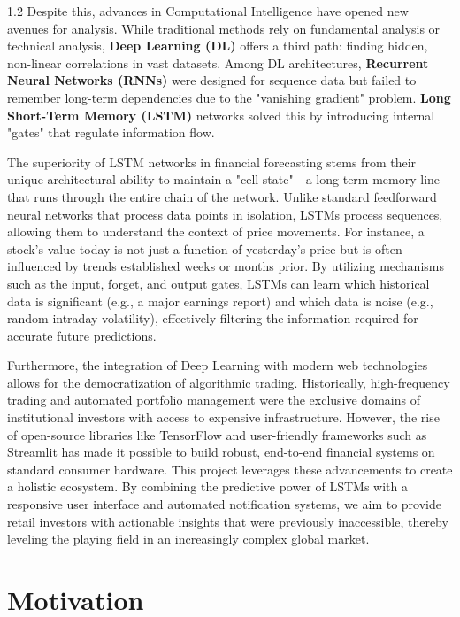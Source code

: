 \documentclass[12pt, a4paper]{report}
\begin{document}
\begin{spacing}{1.2}
Despite this, advances in Computational Intelligence have opened new avenues for analysis. While traditional methods rely on fundamental analysis or technical analysis, \textbf{Deep Learning (DL)} offers a third path: finding hidden, non-linear correlations in vast datasets. Among DL architectures, \textbf{Recurrent Neural Networks (RNNs)} were designed for sequence data but failed to remember long-term dependencies due to the "vanishing gradient" problem. \textbf{Long Short-Term Memory (LSTM)} networks solved this by introducing internal "gates" that regulate information flow.

The superiority of LSTM networks in financial forecasting stems from their unique architectural ability to maintain a "cell state"—a long-term memory line that runs through the entire chain of the network. Unlike standard feedforward neural networks that process data points in isolation, LSTMs process sequences, allowing them to understand the context of price movements. For instance, a stock's value today is not just a function of yesterday's price but is often influenced by trends established weeks or months prior. By utilizing mechanisms such as the input, forget, and output gates, LSTMs can learn which historical data is significant (e.g., a major earnings report) and which data is noise (e.g., random intraday volatility), effectively filtering the information required for accurate future predictions.

Furthermore, the integration of Deep Learning with modern web technologies allows for the democratization of algorithmic trading. Historically, high-frequency trading and automated portfolio management were the exclusive domains of institutional investors with access to expensive infrastructure. However, the rise of open-source libraries like TensorFlow and user-friendly frameworks such as Streamlit has made it possible to build robust, end-to-end financial systems on standard consumer hardware. This project leverages these advancements to create a holistic ecosystem. By combining the predictive power of LSTMs with a responsive user interface and automated notification systems, we aim to provide retail investors with actionable insights that were previously inaccessible, thereby leveling the playing field in an increasingly complex global market.

\section{Motivation}


\end{spacing}
\end{document}
